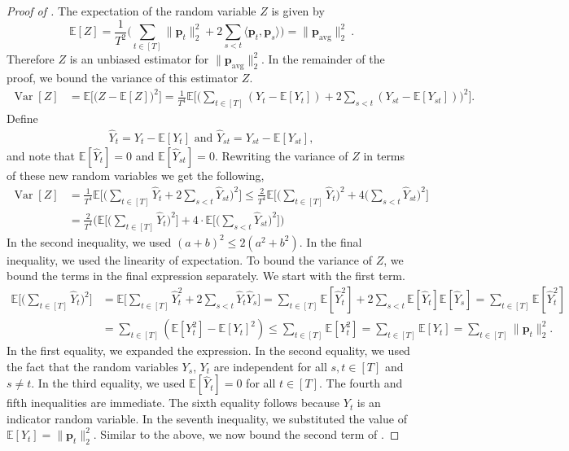 \documentclass[10pt]{article} %
\newcommand{\E}{\mathbb{E}}
\theoremstyle{plain}
\newcommand{\bp}{\textbf{p}}
\newcommand{\avg}{\mathrm{avg}}
\newcommand{\Var}{\operatorname{{Var}}}
\begin{document}
\begin{proof}[Proof of ]
	
	The expectation of the random variable $Z$ is given by
	$$\E[Z]=\frac{1}{T^2}\Big(\sum_{t \in [T]} \|\bp_t\|^2_2 + 2\sum_{s < t}\langle \bp_t, \bp_{s}\rangle\Big)=\|\bp_{\avg}\|^2_2~.$$
	Therefore $Z$ is an unbiased estimator for $\|\bp_{\avg}\|^2_2$. In the remainder of the proof, we bound the variance of this estimator $Z$.
	\begin{align*}
		\Var[Z] &= \E\Big[\Big(Z-\E[Z]\Big)^2\Big]
		= \frac{1}{T^4}\E\Big[\Big(\sum_{t \in [T]}(Y_{t} - \E[Y_{t}]) + 2\sum_{s < t}(Y_{st}-\E[Y_{st}])\Big)^2\Big].
	\end{align*}
	Define
	\begin{align*}
		\hat{Y}_{t} = Y_{t} - \E[Y_{t}] \text{ and }
		\hat{Y}_{st} = Y_{st}-\E[Y_{st}],
	\end{align*}
	and note that $\E[\hat{Y}_{t}]=0$ and $\E[\hat{Y}_{st}]=0$. Rewriting the variance of $Z$ in terms of these new random variables we get the following,
	\begin{align}\label{eq:thm11}
		\Var[Z] &= \frac{1}{T^4}\E\Big[\Big(\sum_{t \in [T]}\hat{Y}_{t} + 2\sum_{s < t}\hat{Y}_{st}\Big)^2\Big]
		\le \frac{2}{T^4}\E\Big[ \Big(\sum_{t \in [T]}\hat{Y}_{t}\Big)^2 + 4\Big(\sum_{s < t}\hat{Y}_{st}\Big)^2 \Big] \nonumber \\ 
		&=\frac{2}{T^4}\Big(\E\Big[\Big(\sum_{t \in [T]}\hat{Y}_{t}\Big)^2\Big] + 4\cdot\E\Big[\Big(\sum_{s < t}\hat{Y}_{st}\Big)^2\Big]\Big)
	\end{align}
	In the second inequality, we used $(a+b)^2 \leq 2(a^2+b^2)$. In the final inequality, we used the linearity of expectation. To bound the variance of $Z$, we bound the terms in the final expression separately. We start with the first term.
	\begin{align}\label{eq:thm12}
		\E\Big[\Big(\sum_{t \in [T]}\hat{Y}_{t}\Big)^2\Big] &= \E\Big[ \sum_{t \in [T]} \hat{Y}_{t}^2 + 2\sum_{s<t}\hat{Y}_{t}\hat{Y}_{s}\Big] 
		= \sum_{t \in [T]} \E[\hat{Y}_{t}^2] + 2\sum_{s<t}\E[\hat{Y}_{t}]\E[\hat{Y}_{s}] = \sum_{t \in [T]} \E[\hat{Y}_{t}^2] \nonumber \\
		& =\sum_{t \in [T]} (\E[{Y}_{t}^2]-\E[{Y}_{t}]^2) \le \sum_{t \in [T]} \E[Y^2_t]
		= \sum_{t \in [T]} \E[Y_{t}] = \sum_{t \in [T]} \|\bp_t\|^2_2.
	\end{align}
	In the first equality, we expanded the expression. In the second equality, we used the fact that the random variables $Y_{s}$, $Y_{t}$ are independent for all $s,t\in [T]$ and $s \neq t$. In the third equality, we used $\E[\hat{Y}_{t}]=0$ for all $t \in [T]$. The fourth and fifth inequalities are immediate. The sixth equality follows because $Y_{t}$ is an indicator random variable. In the seventh inequality, we substituted the value of $\E[Y_{t}]=\|\bp_t\|^2_2$. Similar to the above, we now bound the second term of .
	

\end{proof}
\end{document}
